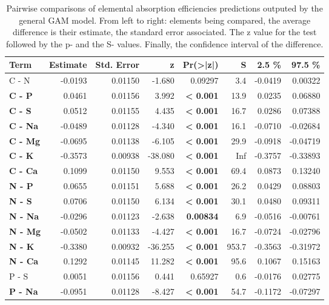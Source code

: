 \begin{table}[H]
\centering
\caption{Pairwise comparisons of elemental absorption efficiencies predictions outputed by the general GAM model. From left to right: elements being compared, the average difference is their estimate, the standard error associated. The z value for the test followed by the p- and the S- values. Finally, the confidence interval of the difference. }
\centering
\begin{tabular}[t]{>{}lrrr>{}rrrr}
\toprule
\textbf{Term} & \textbf{Estimate} & \textbf{Std. Error} & \textbf{z} & \textbf{Pr(>|z|)} & \textbf{S} & \textbf{2.5 \%} & \textbf{97.5 \%}\\
\midrule
C - N & -0.0193 & 0.01150 & -1.680 & 0.09297 & 3.4 & -0.0419 & 0.00322\\
\textbf{C - P} & 0.0461 & 0.01156 & 3.992 & \textbf{< 0.001} & 13.9 & 0.0235 & 0.06880\\
\textbf{C - S} & 0.0512 & 0.01155 & 4.435 & \textbf{< 0.001} & 16.7 & 0.0286 & 0.07388\\
\textbf{C - Na} & -0.0489 & 0.01128 & -4.340 & \textbf{< 0.001} & 16.1 & -0.0710 & -0.02684\\
\textbf{C - Mg} & -0.0695 & 0.01138 & -6.105 & \textbf{< 0.001} & 29.9 & -0.0918 & -0.04719\\
\textbf{C - K} & -0.3573 & 0.00938 & -38.080 & \textbf{< 0.001} & Inf & -0.3757 & -0.33893\\
\textbf{C - Ca} & 0.1099 & 0.01150 & 9.553 & \textbf{< 0.001} & 69.4 & 0.0873 & 0.13240\\
\textbf{N - P} & 0.0655 & 0.01151 & 5.688 & \textbf{< 0.001} & 26.2 & 0.0429 & 0.08803\\
\textbf{N - S} & 0.0706 & 0.01150 & 6.134 & \textbf{< 0.001} & 30.1 & 0.0480 & 0.09311\\
\textbf{N - Na} & -0.0296 & 0.01123 & -2.638 & \textbf{0.00834} & 6.9 & -0.0516 & -0.00761\\
\textbf{N - Mg} & -0.0502 & 0.01133 & -4.427 & \textbf{< 0.001} & 16.7 & -0.0724 & -0.02796\\
\textbf{N - K} & -0.3380 & 0.00932 & -36.255 & \textbf{< 0.001} & 953.7 & -0.3563 & -0.31972\\
\textbf{N - Ca} & 0.1292 & 0.01145 & 11.282 & \textbf{< 0.001} & 95.6 & 0.1067 & 0.15163\\
P - S & 0.0051 & 0.01156 & 0.441 & 0.65927 & 0.6 & -0.0176 & 0.02775\\
\textbf{P - Na} & -0.0951 & 0.01128 & -8.427 & \textbf{< 0.001} & 54.7 & -0.1172 & -0.07297\\

\end{tabular}
\end{table}
